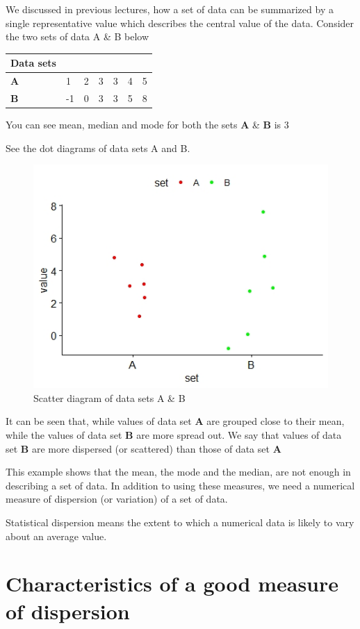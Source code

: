 \documentclass[
]{book}
\begin{document}
We discussed in previous lectures, how a set of data can be summarized
by a single representative value which describes the central value of
the data. Consider the two sets of data A \& B below

\begin{longtable}[]{@{}lllllll@{}}
\toprule
Data sets & & & & & & \\
\midrule
\endhead
\textbf{A} & 1 & 2 & 3 & 3 & 4 & 5 \\
\textbf{B} & -1 & 0 & 3 & 3 & 5 & 8 \\
\bottomrule
\end{longtable}

You can see mean, median and mode for both the sets \textbf{A} \& \textbf{B} is 3

See the dot diagrams of data sets A and B.

\begin{figure}

{\centering \includegraphics[width=0.5\linewidth]{images/image2_d} 

}

\caption{Scatter diagram of data sets A & B}\label{fig:d}
\end{figure}

It can be seen that, while values of data set \textbf{A} are grouped close to
their mean, while the values of data set \textbf{B} are more spread out. We
say that values of data set \textbf{B} are more dispersed (or scattered) than
those of data set \textbf{A}

This example shows that the mean, the mode and the median, are not
enough in describing a set of data. In addition to using these measures,
we need a numerical measure of dispersion (or variation) of a set of
data.

Statistical dispersion means the extent to which a numerical data is
likely to vary about an average value.

\hypertarget{characteristics-of-a-good-measure-of-dispersion}{%
\section{Characteristics of a good measure of dispersion}\label{characteristics-of-a-good-measure-of-dispersion}}
\end{document}
